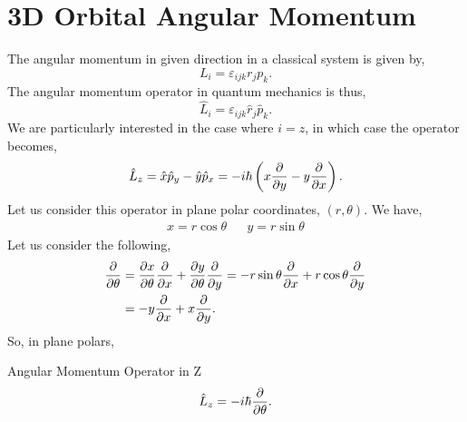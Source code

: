 \documentclass{book}
\begin{document}
\section{3D Orbital Angular Momentum}
The angular momentum in given direction in a classical system is given by,
\begin{equation}
	L_i = \varepsilon_{ijk}r_jp_k.
\end{equation}
The angular momentum operator in quantum mechanics is thus,
\begin{equation}
	\hat{L}_i = \varepsilon_{ijk}\hat{r}_j\hat{p}_k.
\end{equation}
We are particularly interested in the case where $i=z$, in which case the operator becomes,
\begin{equation}
	\hat{L}_z = \hat{x}\hat{p}_y - \hat{y}\hat{p}_x = -i\hbar\left(x\pdv{y} - y\pdv{x}\right).
\end{equation}
Let us consider this operator in plane polar coordinates, $(r, \theta)$. We have,
\begin{align}
	x = r\cos\theta && y = r\sin\theta
\end{align}
Let us consider the following,
\begin{equation}
	\begin{split}
	\pdv{\theta} & = \pdv{x}{\theta}\pdv{x} + \pdv{y}{\theta} \pdv{y} = -r\sin\theta \pdv{x} + r\cos\theta\pdv{y}\\
	& = -y\pdv{x} + x\pdv{y}.
\end{split}
\end{equation}
So, in plane polars,
\begin{Definitions}{Angular Momentum Operator in Z}{}
	\begin{equation}
	\hat{L}_z = -i\hbar \pdv{\theta}.
\end{equation}
\end{Definitions}
\end{document}
